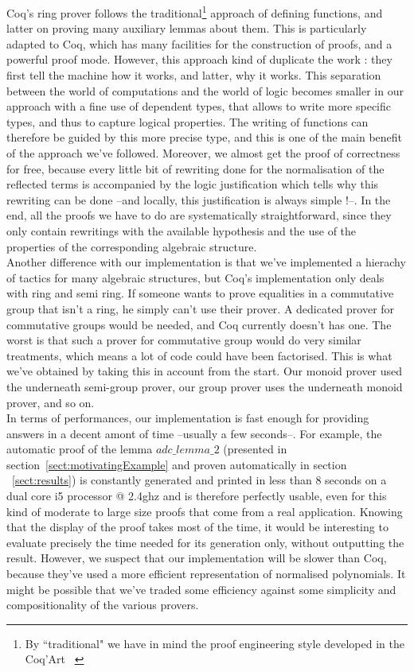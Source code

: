 Coq's ring prover follows the traditional\footnote{By ``traditional" we have in mind the proof engineering style developed in the Coq'Art ~\cite{BertotC04}}  approach of defining functions, and latter on proving many auxiliary lemmas about them. This is particularly adapted to Coq, which has many facilities for the construction of proofs, and a powerful proof mode. However, this approach kind of duplicate the work : they first tell the machine how it works, and latter, why it works. This separation between the world of computations and the world of logic becomes smaller in our approach with a fine use of dependent types, that allows to write more specific types, and thus to capture logical properties. The writing of functions can therefore be guided by this more precise type, and this is one of the main benefit of the approach we've followed. Moreover, we almost get the proof of correctness for free, because every little bit of rewriting done for the normalisation of the reflected terms is accompanied by the logic justification which tells why this rewriting can be done --and locally, this justification is always simple !--. In the end, all the proofs we have to do are systematically straightforward, since they only contain rewritings with the available hypothesis and the use of the properties of the corresponding algebraic structure. \\

Another difference with our implementation is that we've implemented a hierachy of tactics for many algebraic structures, but Coq's implementation only deals with ring and semi ring. If someone wants to prove equalities in a commutative group that isn't a ring, he simply can't use their prover. A dedicated prover for commutative groups would be needed, and Coq currently doesn't has one. The worst is that such a prover for commutative group would do very similar treatments, which means a lot of code could have been factorised. This is what we've obtained by taking this in account from the start. Our monoid prover used the underneath semi-group prover, our group prover uses the underneath monoid prover, and so on. \\

In terms of performances, our implementation is fast enough for providing answers in a decent amont of time --usually a few seconds--. For example, the automatic proof of the lemma $adc\_lemma\_2$ (presented in section~\ref{sect:motivatingExample} and proven automatically in section ~\ref{sect:results}) is constantly generated and printed in less than 8 seconds on a dual core i5 processor @ 2.4ghz and is therefore perfectly usable, even for this kind of moderate to large size proofs that come from a real application. Knowing that the display of the proof takes most of the time, it would be interesting to evaluate precisely the time needed for its generation only, without outputting the result. However, we suspect that our implementation will be slower than Coq, because they've used a more efficient representation of normalised polynomials. It might be possible that we've traded some efficiency against some simplicity and compositionality of the various provers.

